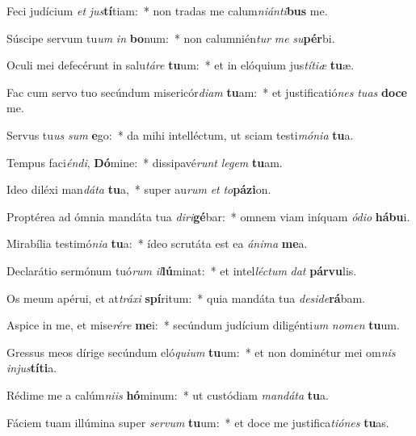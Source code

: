\item Feci judícium \textit{et} \textit{jus}\textbf{tí}tiam:~* non tradas me calum\textit{ni}\textit{án}\textit{ti}\textbf{bus} me.
\item Súscipe servum tu\textit{um} \textit{in} \textbf{bo}num:~* non calumnién\textit{tur} \textit{me} \textit{su}\textbf{pér}bi.
\item Oculi mei defecérunt in salu\textit{tá}\textit{re} \textbf{tu}um:~* et in elóquium jus\textit{tí}\textit{ti}\textit{æ} \textbf{tu}æ.
\item Fac cum servo tuo secúndum misericór\textit{di}\textit{am} \textbf{tu}am:~* et justificatió\textit{nes} \textit{tu}\textit{as} \textbf{do}\textbf{ce} me.
\item Servus tu\textit{us} \textit{sum} \textbf{e}go:~* da mihi intelléctum, ut sciam testi\textit{mó}\textit{ni}\textit{a} \textbf{tu}a.
\item Tempus faci\textit{én}\textit{di}, \textbf{Dó}mine:~* dissipavé\textit{runt} \textit{le}\textit{gem} \textbf{tu}am.
\item Ideo diléxi man\textit{dá}\textit{ta} \textbf{tu}a,~* super au\textit{rum} \textit{et} \textit{to}\textbf{pá}\textbf{zi}on.
\item Proptérea ad ómnia mandáta tua \textit{di}\textit{ri}\textbf{gé}bar:~* omnem viam iníquam \textit{ó}\textit{di}\textit{o} \textbf{há}\textbf{bu}i.
\item Mirabília testimó\textit{ni}\textit{a} \textbf{tu}a:~* ídeo scrutáta est ea \textit{á}\textit{ni}\textit{ma} \textbf{me}a.
\item Declarátio sermónum tuó\textit{rum} \textit{il}\textbf{lú}minat:~* et intel\textit{léc}\textit{tum} \textit{dat} \textbf{pár}\textbf{vu}lis.
\item Os meum apérui, et at\textit{trá}\textit{xi} \textbf{spí}ritum:~* quia mandáta tua \textit{de}\textit{si}\textit{de}\textbf{rá}bam.
\item Aspice in me, et mise\textit{ré}\textit{re} \textbf{me}i:~* secúndum judícium diligénti\textit{um} \textit{no}\textit{men} \textbf{tu}um.
\item Gressus meos dírige secúndum eló\textit{qui}\textit{um} \textbf{tu}um:~* et non dominétur mei om\textit{nis} \textit{in}\textit{jus}\textbf{tí}\textbf{ti}a.
\item Rédime me a calúm\textit{ni}\textit{is} \textbf{hó}minum:~* ut custódiam \textit{man}\textit{dá}\textit{ta} \textbf{tu}a.
\item Fáciem tuam illúmina super \textit{ser}\textit{vum} \textbf{tu}um:~* et doce me justifica\textit{ti}\textit{ó}\textit{nes} \textbf{tu}as.
